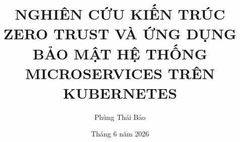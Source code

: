 
 

\title{NGHIÊN CỨU KIẾN TRÚC ZERO TRUST VÀ ỨNG DỤNG BẢO MẬT HỆ THỐNG MICROSERVICES TRÊN KUBERNETES}
\author{Phùng Thái Bảo} %
\date{Tháng 6 năm 2026}


\renewcommand{\contentsname}{MỤC LỤC}
\renewcommand{\listfigurename}{DANH MỤC HÌNH VẼ}
\renewcommand{\listtablename}{DANH MỤC BẢNG BIỂU}




\pagestyle{plain} 


\clearpage
\pagestyle{plain}


\clearpage

\tableofcontents
\clearpage

\listoffigures
\clearpage
\listoftables
\clearpage



\clearpage
{} 
\pagestyle{fancy} 




% 


\appendix
\renewcommand{\chaptername}{Phụ lục}


\clearpage
\pagestyle{plain} 

\printbibliography[heading=bibintoc,title={TÀI LIỆU THAM KHẢO}]
 

